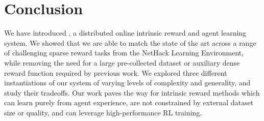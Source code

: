 \section{Conclusion}
We have introduced \oni, a distributed online intrinsic reward and agent learning system. We showed that we are able to match the state of the art across a range of challenging sparse reward tasks from the NetHack Learning Environment, while removing the need for a large pre-collected dataset or auxiliary dense reward function required by previous work. We explored three different instantiations of our system of varying levels of complexity and generality, and study their tradeoffs. Our work paves the way for intrinsic reward methods which can learn purely from agent experience, are not constrained by external dataset size or quality, and can leverage high-performance RL training. 
%

%
%
%
%
